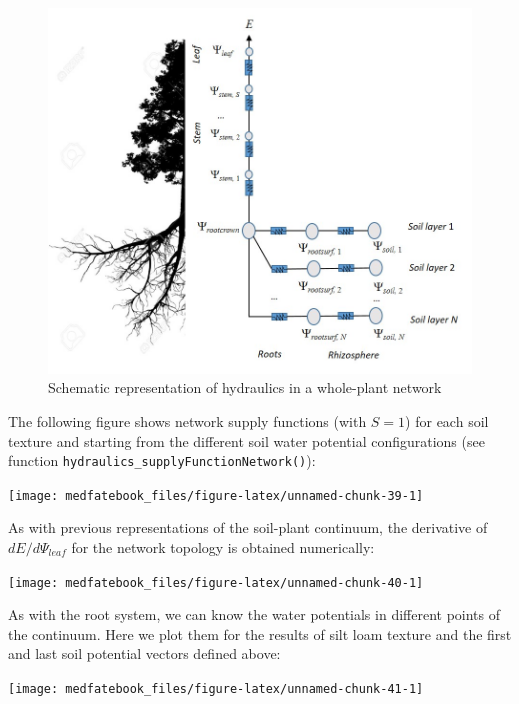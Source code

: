 \documentclass[]{book}
\begin{document}
\begin{figure}

{\centering \includegraphics[width=0.8\linewidth]{hydraulics_nocap} 

}

\caption{Schematic representation of hydraulics in a whole-plant network}\label{fig:unnamed-chunk-38}
\end{figure}

The following figure shows network supply functions (with \(S = 1\)) for
each soil texture and starting from the different soil water potential
configurations (see function
\texttt{hydraulics\_supplyFunctionNetwork()}):

\begin{center}\texttt{[image: medfatebook\_files/figure-latex/unnamed-chunk-39-1]} \end{center}

As with previous representations of the soil-plant continuum, the
derivative of \(dE/d\Psi_{leaf}\) for the network topology is obtained
numerically:

\begin{center}\texttt{[image: medfatebook\_files/figure-latex/unnamed-chunk-40-1]} \end{center}

As with the root system, we can know the water potentials in different
points of the continuum. Here we plot them for the results of silt loam
texture and the first and last soil potential vectors defined above:

\begin{center}\texttt{[image: medfatebook\_files/figure-latex/unnamed-chunk-41-1]} \end{center}
\end{document}
